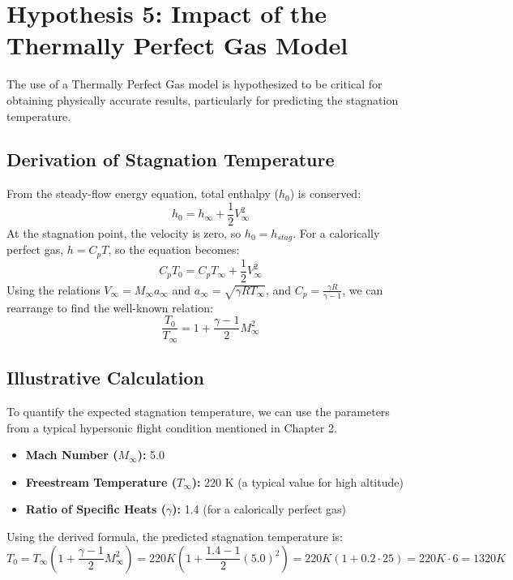 \section{Hypothesis 5: Impact of the Thermally Perfect Gas Model}
The use of a Thermally Perfect Gas model is hypothesized to be critical for obtaining physically accurate results, particularly for predicting the stagnation temperature.

\subsection{Derivation of Stagnation Temperature}
From the steady-flow energy equation, total enthalpy ($h_0$) is conserved:
\begin{equation}
    h_0 = h_{\infty} + \frac{1}{2}V_{\infty}^2
\end{equation}
At the stagnation point, the velocity is zero, so $h_0 = h_{stag}$. For a calorically perfect gas, $h = C_p T$, so the equation becomes:
\begin{equation}
    C_p T_0 = C_p T_{\infty} + \frac{1}{2}V_{\infty}^2
\end{equation}
Using the relations $V_{\infty} = M_{\infty} a_{\infty}$ and $a_{\infty} = \sqrt{\gamma R T_{\infty}}$, and $C_p = \frac{\gamma R}{\gamma - 1}$, we can rearrange to find the well-known relation:
\begin{equation}
    \frac{T_0}{T_{\infty}} = 1 + \frac{\gamma - 1}{2} M_{\infty}^2
\end{equation}

\subsection{Illustrative Calculation}
To quantify the expected stagnation temperature, we can use the parameters from a typical hypersonic flight condition mentioned in Chapter 2.
\begin{itemize}
    \item \textbf{Mach Number ($M_{\infty}$):} 5.0
    \item \textbf{Freestream Temperature ($T_{\infty}$):} 220 K (a typical value for high altitude)
    \item \textbf{Ratio of Specific Heats ($\gamma$):} 1.4 (for a calorically perfect gas)
\end{itemize}

Using the derived formula, the predicted stagnation temperature is:
\begin{equation}
    T_0 = T_{\infty} \left( 1 + \frac{\gamma - 1}{2} M_{\infty}^2 \right) = 220 K \left( 1 + \frac{1.4 - 1}{2} (5.0)^2 \right) = 220 K \left( 1 + 0.2 \cdot 25 \right) = 220 K \cdot 6 = 1320 K
\end{equation}

